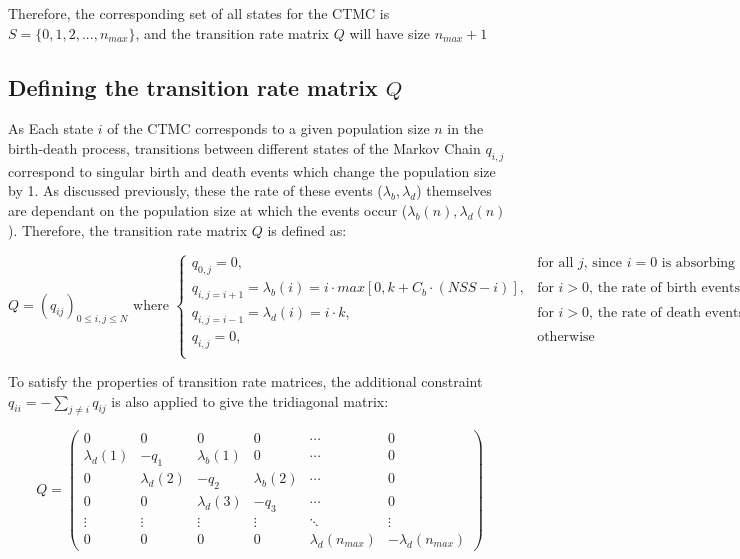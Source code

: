 \documentclass[]{article}
\begin{document}
Therefore, the corresponding set of all states for the CTMC is $S = \{0, 1, 2, ..., n_{max} \}$, and the transition rate matrix $Q$ will have size $n_{max} + 1$

\subsection{Defining the transition rate matrix $Q$}

As Each state $i$ of the CTMC corresponds to a given population size $n$ in the birth-death process, transitions between different states of the Markov Chain $q_{i,j}$ correspond to singular birth and death events which change the population size by 1. As discussed previously, these the rate of these events ($\lambda_b, \lambda_d$) themselves are dependant on the population size at which the events occur ($\lambda_b(n), \lambda_d(n)$). Therefore, the transition rate matrix $Q$ is defined as:

\begin{equation}
	Q = \left( q_{ij} \right)_{0 \leq i, j \leq N} \text{ where }
	\begin{cases}
		q_{0,j} = 0, & \text{for all $j$, since $i = 0$ is absorbing} \\
		q_{i, j = i+1} = \lambda_b(i) = i \cdot max[0, k + C_b \cdot (NSS-i)], & \text{for $i > 0$, the rate of birth events} \\
		q_{i, j = i-1} = \lambda_d(i) = i \cdot k, & \text{for $i > 0$, the rate of death events} \\
		q_{i, j} = 0, & \text{otherwise} \\
	\end{cases}
\end{equation}

To satisfy the properties of transition rate matrices, the additional constraint $q_{ii} = -\sum_{j \neq i} q_{ij}$ is also applied to give the tridiagonal matrix:

\begin{equation}
	Q = 
	\begin{pmatrix}
		0 & 0 & 0 & 0 & \cdots & 0 \\
		\lambda_d(1) & -q_1 & \lambda_b(1) & 0 & \cdots & 0 \\
		0 & \lambda_d(2) & -q_2 & \lambda_b(2) & \cdots & 0 \\
		0 & 0 & \lambda_d(3) & -q_3 & \cdots & 0 \\
		\vdots & \vdots & \vdots & \vdots & \ddots & \vdots \\
		0 & 0 & 0 & 0 & \lambda_d(n_{max}) & -\lambda_d(n_{max})
	\end{pmatrix}
\end{equation}
\end{document}
